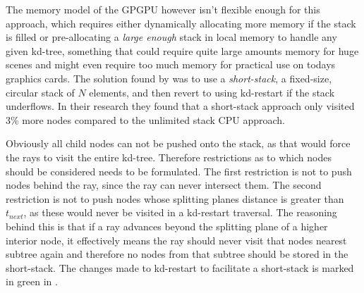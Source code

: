 The memory model of the GPGPU however isn't flexible enough for this
approach, which requires either dynamically allocating more memory if
the stack is filled or pre-allocating a \textit{large enough} stack in
local memory to handle any given kd-tree, something that could require
quite large amounts memory for huge scenes and might even require too
much memory for practical use on todays graphics cards. The solution
found by \horn{} was to use a \textit{short-stack}, a fixed-size,
circular stack of $N$ elements, and then revert to using kd-restart
if the stack underflows. In their research they found that a
short-stack approach only visited 3\% more nodes compared to the
unlimited stack CPU approach.


Obviously all child nodes can not be pushed onto the stack, as that
would force the rays to visit the entire kd-tree. Therefore
restrictions as to which nodes should be considered needs to be
formulated. The first restriction is not to push nodes behind the ray,
since the ray can never intersect them. The second restriction is not
to push nodes whose splitting planes distance is greater than
$t_{next}$, as these would never be visited in a kd-restart
traversal. The reasoning behind this is that if a ray advances beyond
the splitting plane of a higher interior node, it effectively means
the ray should never visit that nodes nearest subtree again and
therefore no nodes from that subtree should be stored in the
short-stack. The changes made to kd-restart to facilitate a
short-stack is marked in green in .

